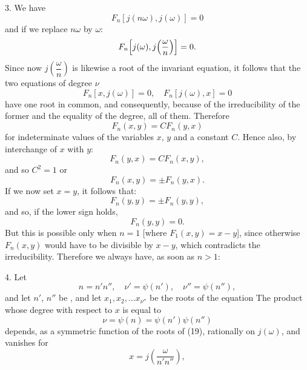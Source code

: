 3. We have
\[
F_n[j(n\omega), j(\omega)] = 0
\]
and if we replace $n\omega$ by $\omega$:
\[
F_n\Bigl[j(\omega), j\Bigl(\frac{\omega}{n}\Bigr)\Bigr] = 0.
\]
Since now $j\left(\dfrac{\omega}{n}\right)$ is likewise a root of the invariant equation, it follows that the two equations of degree $\nu$
\[
F_n[x, j(\omega)] = 0, \quad F_n[j(\omega), x] = 0
\]
have one root in common, and consequently, because of the irreducibility of the former and the equality of the degree, all of them. Therefore
\[
F_n(x, y) = C F_n(y, x)
\]
for indeterminate values of the variables $x$, $y$ and a constant $C$.
Hence also, by interchange of $x$ with $y$:
\[
F_n(y, x) = C F_n(x, y),
\]
and so $C^2 = 1$ or
\[
F_n(x, y) = \pm F_n(y, x).
\]
If we now set $x = y$, it follows that:
\[
F_n(y, y) = \pm F_n(y, y),
\]
and so, if the lower sign holds,
\[
F_n(y, y) = 0.
\]
But this is possible only when $n = 1$ [where $F_1(x, y) = x - y$], since otherwise $F_n(x, y)$ would have to be divisible by $x - y$, which contradicts the irreducibility. Therefore we always have, as soon as $n > 1$:

4. Let
\[
n = n' n'', \quad \nu' = \psi(n'), \quad \nu'' = \psi(n''),
\]
and let $n'$, $n''$ be , and let $x_1, x_2, \dots x_{\nu''}$ be the roots of the equation
The product
whose degree with respect to $x$ is equal to
\[
\nu = \psi(n) = \psi(n') \psi(n'')
\]
depends, as a symmetric function of the roots of (19), rationally on $j(\omega)$, and vanishes for
\[
x = j\left(\frac{\omega}{n' n''}\right),
\]
